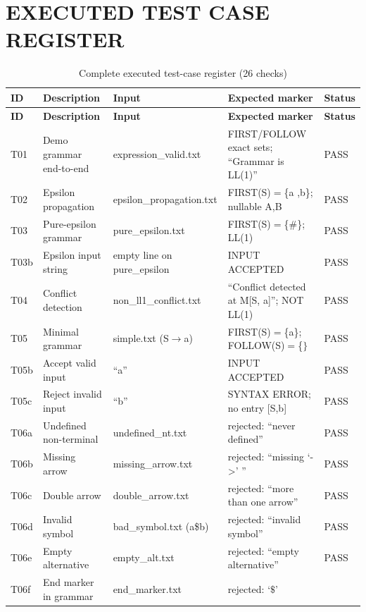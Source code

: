 \documentclass[12pt,a4paper,oneside,openany]{report}
\begin{document}
\section{EXECUTED TEST CASE REGISTER}
\begin{longtable}{@{}p{0.9cm}p{2.5cm}p{3.2cm}>{\raggedright\arraybackslash}p{3.9cm}>{\raggedright\arraybackslash}p{1.5cm}@{}}
  \caption{Complete executed test-case register (26 checks)}
  \label{tab:tc_all}\\
  \toprule
  \textbf{ID} & \textbf{Description} & \textbf{Input} & \textbf{Expected
  marker} & \textbf{Status} \\
  \midrule
  \endfirsthead
  \toprule
  \textbf{ID} & \textbf{Description} & \textbf{Input} & \textbf{Expected
  marker} & \textbf{Status} \\
  \midrule
  \endhead
  \bottomrule
  \endfoot
  T01 & Demo grammar end-to-end & expression\_valid.txt & FIRST/FOLLOW
  exact sets; ``Grammar is LL(1)'' & PASS \\
  T02 & Epsilon propagation & epsilon\_propagation.txt & FIRST(S)$=$\{a
  ,b\}; nullable A,B & PASS \\
  T03 & Pure-epsilon grammar & pure\_epsilon.txt & FIRST(S)$=$\{\#\};
  LL(1) & PASS \\
  T03b & Epsilon input string & empty line on pure\_epsilon & INPUT
  ACCEPTED & PASS \\
  T04 & Conflict detection & non\_ll1\_conflict.txt & ``Conflict
  detected at M[S, a]''; NOT LL(1) & PASS \\
  T05 & Minimal grammar & simple.txt (S$\to$a) & FIRST(S)$=$\{a\};
  FOLLOW(S)$=$\{$\}$ & PASS \\
  T05b & Accept valid input & ``a'' & INPUT ACCEPTED & PASS \\
  T05c & Reject invalid input & ``b'' & SYNTAX ERROR; no entry [S,b] &
  PASS \\
  T06a & Undefined non-terminal & undefined\_nt.txt & rejected: ``never
  defined'' & PASS \\
  T06b & Missing arrow & missing\_arrow.txt & rejected: ``missing
  `-\!>' '' & PASS \\
  T06c & Double arrow & double\_arrow.txt & rejected: ``more than one
  arrow'' & PASS \\
  T06d & Invalid symbol & bad\_symbol.txt (a\$b) & rejected: ``invalid
  symbol'' & PASS \\
  T06e & Empty alternative & empty\_alt.txt & rejected: ``empty
  alternative'' & PASS \\
  T06f & End marker in grammar & end\_marker.txt & rejected: `$\$$'

\end{longtable}
\end{document}
